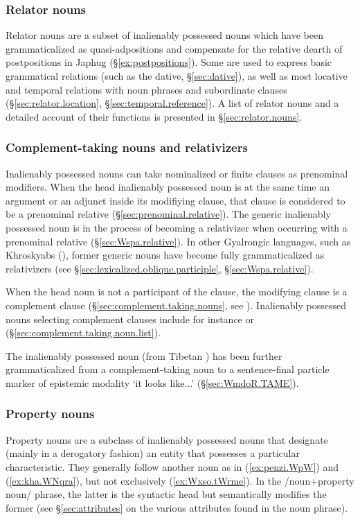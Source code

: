 \subsubsection{Relator nouns}
Relator nouns are a subset of inalienably possessed nouns which have been grammaticalized as quasi-adpositions and compensate for the relative dearth of postpositions in Japhug (§\ref{ex:postpositions}). Some are used to express basic grammatical relations (such as the dative, §\ref{sec:dative}), as well as most locative and temporal relations with noun phrases and subordinate clauses (§\ref{sec:relator.location}, §\ref{sec:temporal.reference}). A list of relator nouns and a detailed account of their functions is presented in §\ref{sec:relator.nouns}.

\subsubsection{Complement-taking nouns and relativizers} \label{sec:complement.taking.IPN}
Inalienably possessed nouns can take nominalized or finite clauses as prenominal modifiers. When the head inalienably possessed noun is at the same time an argument or an adjunct inside its modifiying clause, that clause is considered to be a prenominal relative (§\ref{sec:prenominal.relative}). The generic inalienably possessed noun  is in the process of becoming a relativizer when occurring with a prenominal relative (§\ref{sec:Wspa.relative}). In other Gyalrongic languages, such as Khroskyabs (\citealt[519]{lai17khroskyabs}), former generic nouns have become fully grammaticalized as relativizers (see §\ref{sec:lexicalized.oblique.participle}, §\ref{sec:Wspa.relative}).

When the head noun is not a participant of the clause, the modifying clause is a complement clause (§\ref{sec:complement.taking.nouns}, see \citealt[239--241]{jacques16complementation}). Inalienably possessed nouns selecting complement clauses include for instance  or  (§\ref{sec:complement.taking.noun.list}). 

The inalienably possessed noun  (from Tibetan ) has been further grammaticalized from a com\-ple\-ment-taking noun to a sentence-final particle marker of epistemic modality `it looks like...' (§\ref{sec:WmdoR.TAME}).

 
\subsubsection{Property nouns} \label{sec:property.nouns}
Property nouns are a subclass of inalienably possessed nouns that designate (mainly in a derogatory fashion) an entity that possesses a particular characteristic. They generally follow another noun as in (\ref{ex:penzi.WpW}) and (\ref{ex:kha.WNqra}), but not exclusively (\ref{ex:Wxso.tWrme}). In the /noun+property noun/ phrase, the latter is the syntactic head but semantically modifies the former (see §\ref{sec:attributes} on the various attributes found in the noun phrase). 

